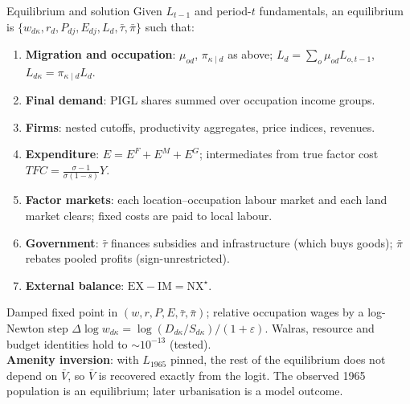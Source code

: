 \documentclass[10pt,aspectratio=169]{beamer}
\newcommand{\hl}[1]{\textcolor{mOrange}{#1}}
\begin{document}
\begin{frame}{Equilibrium and solution}
  \small
  Given $L_{t-1}$ and period-$t$ fundamentals, an equilibrium is
  $\{w_{d\kappa},r_d,P_{dj},E_{dj},L_d,\bar\tau,\bar\pi\}$ such that:
  \begin{enumerate}
    \item \textbf{Migration and occupation}: $\mu_{od}$, $\pi_{\kappa\mid d}$ as above;
          $L_d=\sum_o\mu_{od}L_{o,t-1}$, $L_{d\kappa}=\pi_{\kappa\mid d}L_d$.
    \item \textbf{Final demand}: PIGL shares summed over occupation income groups.
    \item \textbf{Firms}: nested cutoffs, productivity aggregates, price indices, revenues.
    \item \textbf{Expenditure}: $E=E^F+E^M+E^G$; intermediates from true factor cost
          $TFC=\frac{\sigma-1}{\sigma(1-s)}Y$.
    \item \textbf{Factor markets}: each location--occupation labour market and each land
          market clears; fixed costs are paid to local labour.
    \item \textbf{Government}: $\bar\tau$ finances subsidies and infrastructure (which buys
          goods); $\bar\pi$ rebates pooled profits (sign-unrestricted).
    \item \textbf{External balance}: $\mathrm{EX}-\mathrm{IM}=\mathrm{NX}^\star$.
  \end{enumerate}
  Damped fixed point in $(w,r,P,E,\bar\tau,\bar\pi)$; relative occupation wages by a
  log-Newton step $\Delta\log w_{d\kappa}=\log(D_{d\kappa}/S_{d\kappa})/(1+\varepsilon)$.
  Walras, resource and budget identities hold to $\sim10^{-13}$ (tested).\\[0.3em]
  \textbf{Amenity inversion}: with $L_{1965}$ pinned, the rest of the equilibrium does not
  depend on $\bar V$, so $\bar V$ is recovered exactly from the logit. The observed 1965
  population is an equilibrium; later urbanisation is a \hl{model outcome}.
\end{frame}
\end{document}
